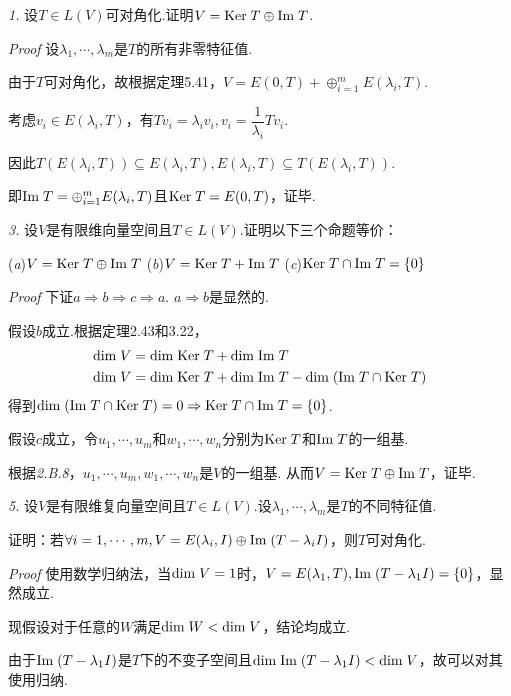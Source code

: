\textit{1.}
设\(T \in L(V)\)可对角化.证明\(V=\mathrm{Ker \;} T \oplus \mathrm{Im \;} T\).

\textit{Proof}
设\(\lambda_1,\cdots,\lambda_m\)是\(T\)的所有非零特征值.

由于\(T\)可对角化，故根据定理5.41，\(V=E(0,T)+\oplus_{i=1}^m E(\lambda_i,T)\).

考虑\(v_i \in E(\lambda_i,T)\)，有\(Tv_i=\lambda_iv_i,v_i=\dfrac{1}{\lambda_i}Tv_i\).

因此\(T(E(\lambda_i,T)) \subseteq E(\lambda_i,T),E(\lambda_i,T) \subseteq T(E(\lambda_i,T))\).

即\(\mathrm{Im \;} T=\oplus_{i=1}^m E(\lambda_i,T)\)且\(\mathrm{Ker \;} T=E(0,T)\)，证毕.

\hspace*{\fill}

\textit{3.}
设\(V\)是有限维向量空间且\(T \in L(V)\).证明以下三个命题等价：

(\textit{a})\(V=\mathrm{Ker \;} T \oplus \mathrm{Im \;} T\) \quad
(\textit{b})\(V=\mathrm{Ker \;} T+\mathrm{Im \;} T\) \quad
(\textit{c})\(\mathrm{Ker \;} T \cap \mathrm{Im \;} T=\{0\}\)

\textit{Proof}
下证\(a \Rightarrow b \Rightarrow c \Rightarrow a\).
\(a \Rightarrow b\)是显然的.

假设\(b\)成立.根据定理2.43和3.22，
    \begin{align*}
        \mathrm{dim \;} V &= \mathrm{dim \;} \mathrm{Ker \;} T+\mathrm{dim \;} \mathrm{Im \;} T \\
        \mathrm{dim \;} V &= \mathrm{dim \;} \mathrm{Ker \;} T+\mathrm{dim \;} \mathrm{Im \;} T-\mathrm{dim \;} (\mathrm{Im \;} T \cap \mathrm{Ker \;} T)
    \end{align*}
得到\(\mathrm{dim \;} (\mathrm{Im \;} T \cap \mathrm{Ker \;} T)=0 \Rightarrow \mathrm{Ker \;} T \cap \mathrm{Im \;} T=\{0\}\).

假设\(c\)成立，令\(u_1,\cdots,u_m\)和\(w_1,\cdots,w_n\)分别为\(\mathrm{Ker \;} T\)和\(\mathrm{Im \;} T\)的一组基.

根据\textit{2.B.8}，\(u_1,\cdots,u_m,w_1,\cdots,w_n\)是\(V\)的一组基.
从而\(V=\mathrm{Ker \;} T \oplus \mathrm{Im \;} T\)，证毕.

\hspace*{\fill}

\textit{5.}
设\(V\)是有限维复向量空间且\(T \in L(V)\).设\(\lambda_1,\cdots,\lambda_m\)是\(T\)的不同特征值.

证明：若\(\forall i=1,\cdots,m,V=E(\lambda_i,I) \oplus \mathrm{Im \;}(T-\lambda_i I)\)，则\(T\)可对角化.

\textit{Proof}
使用数学归纳法，当\(\mathrm{dim \;} V=1\)时，\(V=E(\lambda_1,T),\mathrm{Im \;}(T-\lambda_1 I)=\{0\}\)，显然成立.

现假设对于任意的\(W\)满足\(\mathrm{dim \;} W<\mathrm{dim \;} V\)，结论均成立.

由于\(\mathrm{Im \;}(T-\lambda_1 I)\)是\(T\)下的不变子空间且\(\mathrm{dim \;} \mathrm{Im \;}(T-\lambda_1 I)<\mathrm{dim \;} V\)，故可以对其使用归纳.

